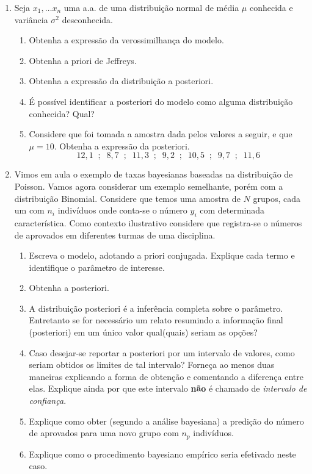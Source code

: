 \documentclass[11pt,a4]{article}\usepackage[]{graphicx}\usepackage[]{xcolor}
\begin{document}
\begin{enumerate}
\item Seja $x_1, \ldots x_n$ uma a.a. de uma distribuição normal de média $\mu$ conhecida
e variância $\sigma^2$ desconhecida. 
\begin{enumerate}
\item Obtenha a expressão da verossimilhança do modelo.
\item Obtenha a priori de Jeffreys.
\item Obtenha a expressão da distribuição a posteriori.
\item É possível identificar a posteriori do modelo como alguma distribuição conhecida? Qual?
\item Considere que foi tomada a amostra dada pelos valores a seguir, e que $\mu = 10$. Obtenha a expressão
da posteriori.
\[ 12,1 \;\;;\;\; 8,7 \;\;;\;\; 11,3 \;\;;\;\; 9,2 \;\;;\;\; 10,5 \;\;;\;\; 9,7 \;\;;\;\; 11,6\]
\end{enumerate}


\item Vimos em aula o exemplo de taxas bayesianas baseadas na distribuição de Poisson.
  Vamos agora considerar um exemplo semelhante, porém com a distribuição Binomial.
  Considere que temos uma amostra de $N$ grupos, cada um com $n_i$ indivíduos
  onde conta-se o número $y_i$ com determinada característica.
  Como contexto ilustrativo considere que registra-se o números de aprovados
  em diferentes turmas de uma disciplina.
\begin{enumerate}
  \item Escreva o modelo, adotando a priori conjugada. Explique cada termo e identifique o parâmetro de interesse. 
  \item Obtenha a posteriori.
  \item A distribuição posteriori é a inferência completa sobre o parâmetro. Entretanto se for necessário um relato resumindo a informação final (posteriori) em um único valor qual(quais) seriam as opções?
  \item Caso desejar-se reportar a posteriori por um intervalo de valores, como seriam obtidos os limites de tal intervalo? Forneça ao menos duas maneiras explicando a forma de obtenção e comentando a diferença entre elas. Explique ainda por que este intervalo \textbf{não} é chamado de \textit{intervalo de confiança}.
  \item Explique como obter (segundo a análise bayesiana) a predição do número de 
    aprovados para uma novo grupo com $n_p$ indivíduos. 
  \item Explique como o procedimento bayesiano empírico seria efetivado neste caso.
\end{enumerate}
  



\end{enumerate}
\end{document}
